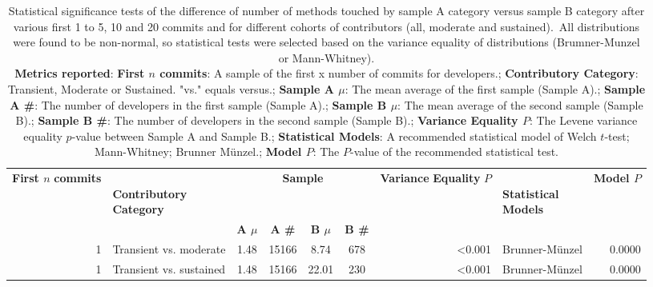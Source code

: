\begin{table}[H]
\centering
\setlength{\tabcolsep}{2pt}
\caption[Statistical Significance Normality and Variance tests for methods for  sample A category versus sample B category  for 1 to 5, 10 and 20]{Statistical significance tests of the difference of number of methods touched by  sample A category versus sample B category  after various first 1 to 5, 10 and 20 commits and for different cohorts of contributors (all, moderate and sustained). All distributions were found to be non-normal, so statistical tests were selected based on the variance equality of distributions (Brumner-Munzel or Mann-Whitney). \\ \textbf{Metrics reported}:   \textbf{First $n$ commits}: A sample of the first x number of commits for developers.;  \textbf{Contributory Category}: Transient, Moderate or Sustained. "vs." equals versus.;  \textbf{Sample A $\mu$}: The mean average of the first sample (Sample A).;  \textbf{Sample A \#}: The number of developers in the first sample (Sample A).;  \textbf{Sample B $\mu$}: The mean average of the second sample (Sample B).;  \textbf{Sample B \#}: The number of developers in the second sample (Sample B).;  \textbf{Variance Equality $P$}: The Levene variance equality $p$-value between Sample A and Sample B.;  \textbf{Statistical Models}: A recommended statistical model of Welch $t$-test; Mann-Whitney; Brunner Münzel.;  \textbf{Model $P$}: The $P$-value of the recommended statistical test.
}
\begin{tabular}{r p{4cm} c c c c r l r}
\toprule
\makecell[t]{\textbf{First $n$}\\\textbf{commits}} & \makecell[t]{\textbf{}\\\textbf{Contributory}\\\textbf{Category}} & \multicolumn{4}{c}{\textbf{Sample}} & \makecell[t]{\textbf{Variance}\\\textbf{Equality}\\\textbf{$P$}} & \makecell[t]{\textbf{}\\\textbf{Statistical}\\\textbf{Models}} & \textbf{Model $P$} \\ 
\cmidrule(lr){3-6}
 &  & \textbf{A $\mu$} & \textbf{A \#} & \textbf{B $\mu$} & \textbf{B \#} &  &  &  \\ 
\midrule
1 & Transient vs. moderate &  1.48 & 15166 & 8.74 & 678 & \textless 0.001 &  Brunner-Münzel & 0.0000 \\ 
1 & Transient vs. sustained &  1.48 & 15166 & 22.01 & 230 & \textless 0.001 &  Brunner-Münzel & 0.0000 \\ 

\end{tabular}
\end{table}
